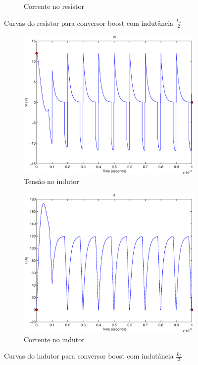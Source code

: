 \documentclass{article}
\begin{document}
\begin{figure}[H]
\begin{subfigure}[b]{0.4\linewidth}
		\caption{Corrente no resistor}
	\end{subfigure}
	\caption{Curvas do resistor para conversor boost com indutância $\frac{L_b}{2}$}
	\label{fig:bor2}
\end{figure}
\begin{figure}[H]
	\centering
	\begin{subfigure}[b]{0.4\linewidth}
		\includegraphics[width=\linewidth]{matlab/boost/b_vl2}
		\caption{Tensão no indutor}
	\end{subfigure}
	\begin{subfigure}[b]{0.4\linewidth}
		\centering
		\includegraphics[width=\linewidth]{matlab/boost/b_il2}
		\caption{Corrente no indutor}
	\end{subfigure}
	\caption{Curvas do indutor para conversor boost com indutância $\frac{L_b}{2}$}
	\label{fig:bol2}
\end{figure}
\end{document}
